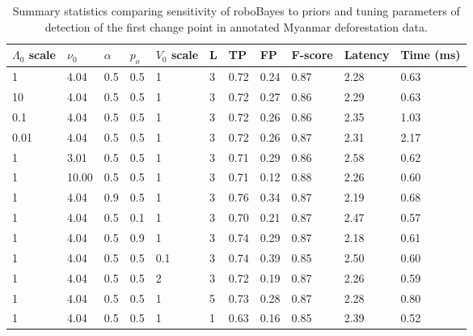 \begin{table}[H]
\centering
\caption{Summary statistics comparing sensitivity of roboBayes to priors and tuning parameters of detection of the first change point in annotated Myanmar deforestation data.} 
\label{tab:myanmar_sensitivity_results}
\begin{tabular}{lllllllllll}
  \hline
$\Lambda_0$ scale & $\nu_0$ & $\alpha$ & $p_o$ & $V_0$ scale & L & TP & FP & F-score & Latency & Time (ms) \\ 
  \hline
1 &  4.04 & 0.5 & 0.5 & 1 & 3 & 0.72 & 0.24 & 0.87 & 2.28 & 0.63 \\ 
  10 &  4.04 & 0.5 & 0.5 & 1 & 3 & 0.72 & 0.27 & 0.86 & 2.29 & 0.63 \\ 
  0.1 &  4.04 & 0.5 & 0.5 & 1 & 3 & 0.72 & 0.26 & 0.86 & 2.35 & 1.03 \\ 
  0.01 &  4.04 & 0.5 & 0.5 & 1 & 3 & 0.72 & 0.26 & 0.87 & 2.31 & 2.17 \\ 
  1 &  3.01 & 0.5 & 0.5 & 1 & 3 & 0.71 & 0.29 & 0.86 & 2.58 & 0.62 \\ 
  1 & 10.00 & 0.5 & 0.5 & 1 & 3 & 0.71 & 0.12 & 0.88 & 2.26 & 0.60 \\ 
  1 &  4.04 & 0.9 & 0.5 & 1 & 3 & 0.76 & 0.34 & 0.87 & 2.19 & 0.68 \\ 
  1 &  4.04 & 0.5 & 0.1 & 1 & 3 & 0.70 & 0.21 & 0.87 & 2.47 & 0.57 \\ 
  1 &  4.04 & 0.5 & 0.9 & 1 & 3 & 0.74 & 0.29 & 0.87 & 2.18 & 0.61 \\ 
  1 &  4.04 & 0.5 & 0.5 & 0.1 & 3 & 0.74 & 0.39 & 0.85 & 2.50 & 0.60 \\ 
  1 &  4.04 & 0.5 & 0.5 & 2 & 3 & 0.72 & 0.19 & 0.87 & 2.26 & 0.59 \\ 
  1 &  4.04 & 0.5 & 0.5 & 1 & 5 & 0.73 & 0.28 & 0.87 & 2.28 & 0.80 \\ 
  1 &  4.04 & 0.5 & 0.5 & 1 & 1 & 0.63 & 0.16 & 0.85 & 2.39 & 0.52 \\ 
  \end{tabular}
\end{table}
